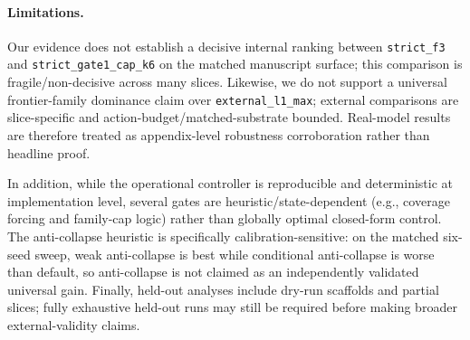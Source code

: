 \paragraph{Limitations.}
Our evidence does not establish a decisive internal ranking between \texttt{strict\_f3} and \texttt{strict\_gate1\_cap\_k6} on the matched manuscript surface; this comparison is fragile/non-decisive across many slices. Likewise, we do not support a universal frontier-family dominance claim over \texttt{external\_l1\_max}; external comparisons are slice-specific and action-budget/matched-substrate bounded. Real-model results are therefore treated as appendix-level robustness corroboration rather than headline proof.

In addition, while the operational controller is reproducible and deterministic at implementation level, several gates are heuristic/state-dependent (e.g., coverage forcing and family-cap logic) rather than globally optimal closed-form control. The anti-collapse heuristic is specifically calibration-sensitive: on the matched six-seed sweep, weak anti-collapse is best while conditional anti-collapse is worse than default, so anti-collapse is not claimed as an independently validated universal gain. Finally, held-out analyses include dry-run scaffolds and partial slices; fully exhaustive held-out runs may still be required before making broader external-validity claims.
